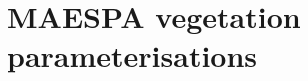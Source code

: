 \documentclass[final,3p,times,authoryear]{elsarticle}
\begin{document}
\section{MAESPA vegetation parameterisations}\label{sec:maespavegpara}  
%
%
%
%
%
% 
%
%
%
%
%
%
%
%		
%
%
%
%
%
%
%
%


%
\end{document}
